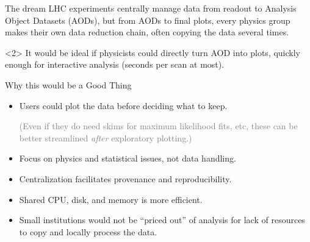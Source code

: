 \documentclass{beamer}
\begin{document}
\begin{frame}{The dream}
\vspace{0.5 cm}
LHC experiments centrally manage data from readout to Analysis Object Datasets (AODs), but from AODs to final plots, every physics group makes their own data reduction chain, often copying the data several times.

\vspace{0.2 cm}

\vspace{0.5 cm}
\begin{uncoverenv}<2>
It would be ideal if physicists could directly turn AOD into plots, quickly enough for interactive analysis (seconds per scan at most).
\end{uncoverenv}
\end{frame}

\begin{frame}{Why this would be a Good Thing}
\large
\vspace{0.5 cm}
\begin{itemize}\setlength{\itemsep}{0.5 cm}
\item Users could plot the data before deciding what to keep.

\vspace{0.2 cm}
\textcolor{gray}{\normalsize (Even if they do need skims for maximum likelihood fits, etc, these can be better streamlined {\it after} exploratory plotting.)}

\vspace{-0.2 cm}
\item Focus on physics and statistical issues, not data handling.
\item Centralization facilitates provenance and reproducibility.
\item Shared CPU, disk, and memory is more efficient.
\item Small institutions would not be ``priced out'' of analysis for lack of resources to copy and locally process the data.
\end{itemize}
\end{frame}
\end{document}
